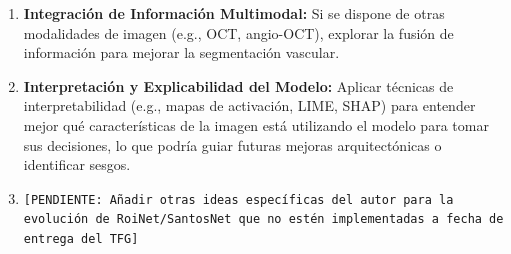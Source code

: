 \documentclass[11pt,a4paper]{report} %
\begin{document}
\begin{enumerate}
\begin{itemize}
        \item Adaptar el modelo para la cuantificación de biomarcadores vasculares relevantes (e.g., diámetro vascular, tortuosidad, densidad vascular).
        \item Investigar la extensión de la arquitectura para la segmentación multiclase (e.g., distinguir arterias de venas) o para la detección y segmentación simultánea de vasos y lesiones patológicas (e.g., microaneurismas, exudados).
    \end{itemize}
  \item \textbf{Integración de Información Multimodal:} Si se dispone de otras modalidades de imagen (e.g., OCT, angio-OCT), explorar la fusión de información para mejorar la segmentación vascular.
  \item \textbf{Interpretación y Explicabilidad del Modelo:} Aplicar técnicas de interpretabilidad (e.g., mapas de activación, LIME, SHAP) para entender mejor qué características de la imagen está utilizando el modelo para tomar sus decisiones, lo que podría guiar futuras mejoras arquitectónicas o identificar sesgos.
  \item \texttt{[PENDIENTE: Añadir otras ideas específicas del autor para la evolución de RoiNet/SantosNet que no estén implementadas a fecha de entrega del TFG]}
\end{enumerate}
\end{document}
